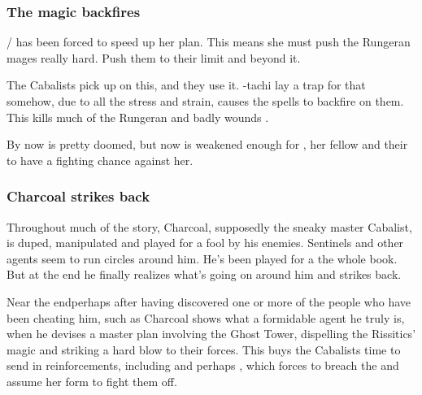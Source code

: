 \begin{garbage}
\subsubsection{The \EreshKali{} magic backfires}
\Nzessuacrith/\Takestsha{} has been forced to speed up her plan. 
This means she must push the Rungeran mages really hard. 
Push them to their limit and beyond it. 

The Cabalists pick up on this, and they use it. 
\Achsah-tachi lay a trap for \Takestsha{} that somehow, due to all the stress and strain, causes the \EreshKali{} spells to backfire on them. 
This kills much of the Rungeran \ishrah{} and badly wounds \Takestsha. 

By now \Forklin{} is pretty doomed, but now \Nzessuacrith{} is weakened enough for \Achsah{}, her fellow \resphain{} and their \hs{\umbrae} to have a fighting chance against her. 





\subsubsection{Charcoal strikes back}
Throughout much of the story, Charcoal, supposedly the sneaky master Cabalist, is duped, manipulated and played for a fool by his enemies. Sentinels and other agents seem to run circles around him. 
He's been played for a  the whole book. 
But at the end he finally realizes what's going on around him and strikes back. 

Near the end\dash perhaps after having discovered one or more of the people who have been cheating him, such as \Sanyor\dash Charcoal shows what a formidable agent he truly is, when he devises a master plan involving the Ghost Tower, dispelling the Rissitics'  magic and striking a hard blow to their forces. This buys the Cabalists time to send in reinforcements, including \banes{} and perhaps \resphain, which forces \Nzessuacrith{} to breach the \charade{} and assume her \draconic{} form to fight them off. 



\end{garbage}
